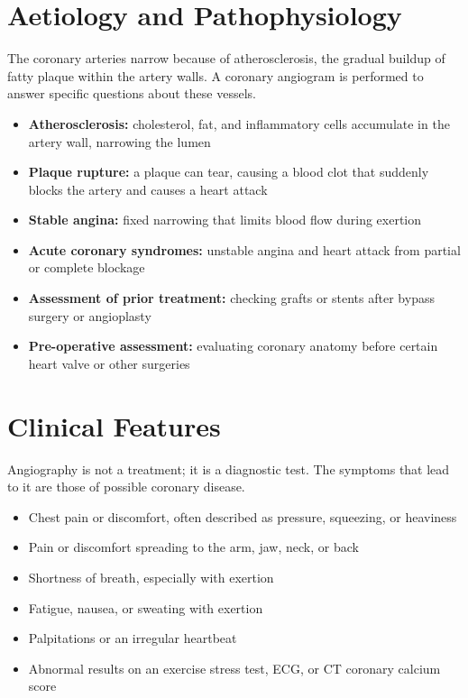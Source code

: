 \section*{Aetiology and Pathophysiology}
The coronary arteries narrow because of atherosclerosis, the gradual buildup of fatty plaque within the artery walls. A coronary angiogram is performed to answer specific questions about these vessels.

\begin{itemize}
    \item \textbf{Atherosclerosis:} cholesterol, fat, and inflammatory cells accumulate in the artery wall, narrowing the lumen
    \item \textbf{Plaque rupture:} a plaque can tear, causing a blood clot that suddenly blocks the artery and causes a heart attack
    \item \textbf{Stable angina:} fixed narrowing that limits blood flow during exertion
    \item \textbf{Acute coronary syndromes:} unstable angina and heart attack from partial or complete blockage
    \item \textbf{Assessment of prior treatment:} checking grafts or stents after bypass surgery or angioplasty
    \item \textbf{Pre-operative assessment:} evaluating coronary anatomy before certain heart valve or other surgeries
\end{itemize}

\section*{Clinical Features}
Angiography is not a treatment; it is a diagnostic test. The symptoms that lead to it are those of possible coronary disease.

\begin{itemize}
    \item Chest pain or discomfort, often described as pressure, squeezing, or heaviness
    \item Pain or discomfort spreading to the arm, jaw, neck, or back
    \item Shortness of breath, especially with exertion
    \item Fatigue, nausea, or sweating with exertion
    \item Palpitations or an irregular heartbeat
    \item Abnormal results on an exercise stress test, ECG, or CT coronary calcium score
\end{itemize}

